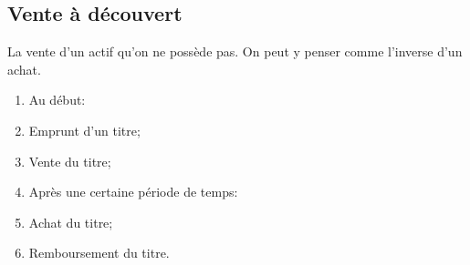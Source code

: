 \documentclass[10pt, french]{article}
\begin{document}
\begin{multicols*}{2}

\columnbreak

\subsection*{Vente à découvert}

\begin{definitionNOHFILL} 
La vente d'un actif qu'on ne possède pas. On peut y penser comme l'inverse d'un achat.\\

\begin{algo2}
\begin{multicols*}{2}
\begin{enumerate}[leftmargin = *]
	\item[]	Au début:\\
	\item 	Emprunt d'un titre;
	\item	Vente du titre;
	\item[]	Après une certaine période de temps:
	\item	Achat du titre;
	\item	Remboursement du titre.
\end{enumerate}	
\end{multicols*}
\end{algo2}
\end{definitionNOHFILL}


\end{multicols*}
\end{document}

